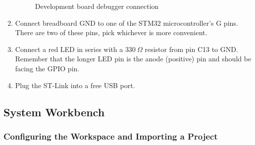 \documentclass{UoNMCHA}
\numberwithin{equation}{section}
\begin{document}
\begin{enumerate}
    \begin{figure}[h!]
    \centering
        \qquad
        \caption{Development board debugger connection}
        \label{fig:stm32_debug}
    
    \end{figure}

    \item Connect breadboard GND to one of the STM32 microcontroller's G pins. There are two of these pins, pick whichever is more convenient.
    
    \item Connect a red LED in series with a $330~\Omega$ resistor from pin C13 to GND. Remember that the longer LED pin is the anode (positive) pin and should be facing the GPIO pin.
    
    \item Plug the ST-Link into a free USB port.  
    
\end{enumerate}

\subsection{System Workbench}
\subsubsection{Configuring the Workspace and Importing a Project}
\end{document}
